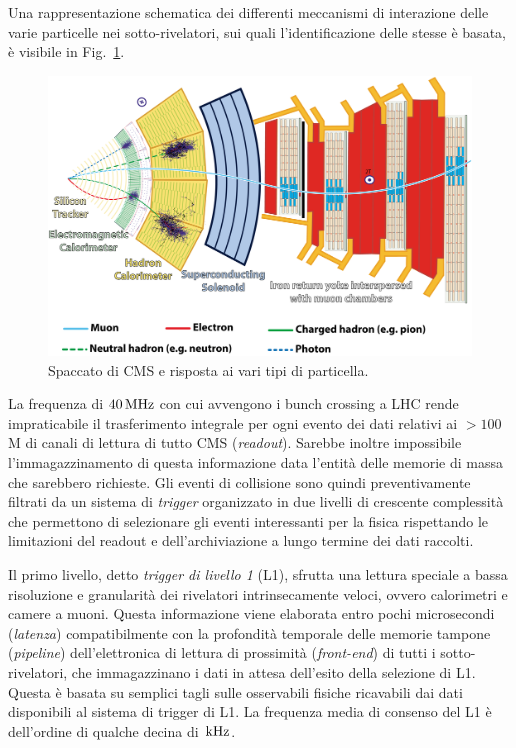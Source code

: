Una rappresentazione schematica dei differenti meccanismi di interazione delle varie particelle nei sotto-rivelatori, sui quali l'identificazione delle stesse \`e basata, \`e visibile in Fig.~\ref{CMSbis}.
\begin{figure}
\centering
\includegraphics[scale=0.8]{Immagini/CMSbis}
\caption{Spaccato di CMS e risposta ai vari tipi di particella.}
\label{CMSbis}
\end{figure}

La frequenza di $40{\rm \, MHz}$ con cui avvengono i bunch crossing a LHC rende impraticabile il trasferimento integrale per ogni evento dei dati relativi ai $>100$M di canali di lettura di tutto CMS ({\em readout}). Sarebbe inoltre impossibile l'immagazzinamento di questa informazione data l'entit\`a delle memorie di massa che sarebbero richieste. Gli eventi di collisione sono quindi preventivamente filtrati da un sistema di {\em trigger} organizzato in due livelli di crescente complessit\`a che permettono di selezionare gli eventi interessanti per la fisica rispettando le limitazioni del readout e dell'archiviazione a lungo termine dei dati raccolti.

Il primo livello, detto {\em trigger di livello 1} (L1)\cite{Dasu:2000ge}, sfrutta una lettura speciale a bassa risoluzione e granularit\`a dei rivelatori intrinsecamente veloci, ovvero calorimetri e camere a muoni. Questa informazione viene elaborata entro pochi microsecondi ({\em latenza}) compatibilmente con la profondit\`a temporale delle memorie tampone ({\em pipeline}) dell'elettronica di lettura di prossimit\`a ({\em front-end}) di tutti i sotto-rivelatori, che immagazzinano i dati in attesa dell'esito della selezione di L1. Questa \`e basata su semplici tagli sulle osservabili fisiche ricavabili dai dati disponibili al sistema di trigger di L1. La frequenza media di consenso del L1 \`e dell'ordine di qualche decina di ${\rm \, kHz}$.

